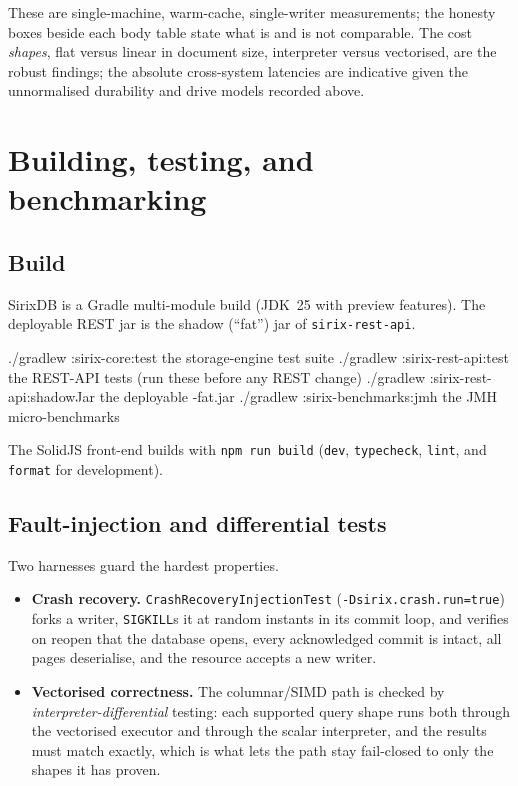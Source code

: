\documentclass[11pt,a4paper,oneside]{report}
\newcommand{\dcap}[1]{\par\vspace{1pt}\noindent{\small\sffamily\bfseries\color{slate}#1}\par\vspace{-2pt}}
\theoremstyle{sirixthm}
\newcommand{\code}[1]{\texttt{#1}}
\begin{document}
These are single-machine, warm-cache, single-writer measurements; the honesty boxes
beside each body table state what is and is not comparable. The cost \emph{shapes}, flat versus linear in
document size, interpreter versus vectorised, are the robust findings; the absolute cross-system latencies
are indicative given the unnormalised durability and drive models recorded above.



\section{Building, testing, and benchmarking}
\label{app:build}

\subsection{Build}

SirixDB is a Gradle multi-module build (JDK~25 with preview features). The deployable REST jar is the
shadow (``fat'') jar of \code{sirix-rest-api}.

\dcap{Common Gradle targets}
\begin{diagramS}
./gradlew :sirix-core:test            the storage-engine test suite
./gradlew :sirix-rest-api:test        the REST-API tests (run these before any REST change)
./gradlew :sirix-rest-api:shadowJar   the deployable -fat.jar
./gradlew :sirix-benchmarks:jmh       the JMH micro-benchmarks
\end{diagramS}

The SolidJS front-end builds with \code{npm run build} (\code{dev}, \code{typecheck}, \code{lint}, and
\code{format} for development).

\subsection{Fault-injection and differential tests}

Two harnesses guard the hardest properties.

\begin{itemize}[leftmargin=1.4em]
\item \textbf{Crash recovery.} \code{CrashRecoveryInjectionTest} (\code{-Dsirix.crash.run=true}) forks a
  writer, \code{SIGKILL}s it at random instants in its commit loop, and verifies on reopen that the
  database opens, every acknowledged commit is intact, all pages deserialise, and the resource accepts a
  new writer.
\item \textbf{Vectorised correctness.} The columnar/SIMD path is checked by
  \emph{interpreter-differential} testing: each supported query shape runs both through the vectorised
  executor and through the scalar interpreter, and the results must match exactly, which is what lets the
  path stay fail-closed to only the shapes it has proven.
\end{itemize}
\end{document}
